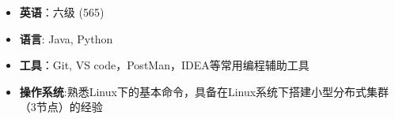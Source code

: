   \begin{itemize}[leftmargin=*]
    \item \textbf{英语}：六级 {\color{labelgrey}(565)}
    \item \textbf{语言}: Java, Python
    \item \textbf{工具}：Git, VS code，PostMan，IDEA等常用编程辅助工具
    \item \textbf{操作系统}:熟悉Linux下的基本命令，具备在Linux系统下搭建小型分布式集群（3节点）的经验 \\
  \end{itemize}
